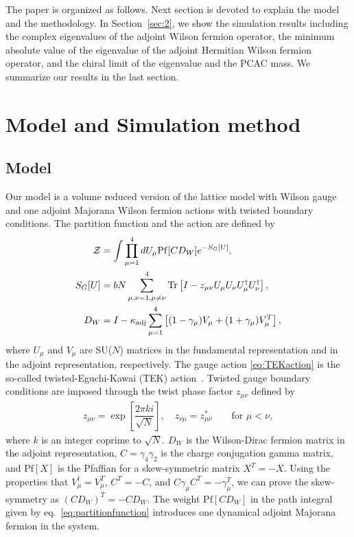 \documentclass[a4paper,11pt]{article}
\begin{document}
The paper is organized as follows. Next section is devoted to explain
the model and the methodology.
In Section~\ref{sec:2}, we show the simulation results including
the complex eigenvalues of the adjoint Wilson fermion operator,
the minimum absolute value of the eigenvalue of the adjoint Hermitian Wilson fermion operator,
and the chiral limit of the eigenvalue and the PCAC mass.
We summarize our results in the last section.

\section{Model and Simulation method}
\subsection{Model}
Our model is a volume reduced version of the lattice model with Wilson gauge and one adjoint Majorana Wilson
fermion actions with twisted boundary conditions.
The partition function and the action are defined by
\begin{align}
  {\cal Z} & =\int \prod_{\mu=1}^{4} dU_{\mu} \mathrm{Pf}[CD_W]e^{-S_G[U]},
             \label{eq:partitionfunction}
  \\
  S_G[U] &=  b N \sum_{\mu,\nu=1,\mu\ne\nu}^{4} \mathrm{Tr}\left[ I - z_{\mu\nu} U_{\mu}U_{\nu}U_{\mu}^{\dag}U_{\nu}^{\dag}\right],
             \label{eq:TEKaction}
  \\
  D_W&= I - \kappa_{\mathrm{adj}}\sum_{\mu=1}^{4}\left[ (1-\gamma_{\mu}) V_{\mu} + (1+\gamma_\mu)V_{\mu}^{T}\right],
             \label{eq:AdjWDmatrix}
\end{align}
where $U_\mu$ and  $V_\mu$ are SU($N$) matrices in the fundamental representation and in the adjoint representation, respectively.
The gauge action \eqref{eq:TEKaction} is the so-called twisted-Eguchi-Kawai (TEK)
action~\cite{Eguchi:1982nm,GonzalezArroyo:1982ub,GonzalezArroyo:1982hz}.
Twisted gauge boundary conditions are imposed through the twist phase factor $z_{\mu\nu}$ defined by
\begin{align}
 z_{\mu\nu} =\exp\left[\dfrac{2\pi k i}{\sqrt{N}}\right], \quad z_{\nu\mu}=z_{\mu\nu}^{*} \qquad \mbox{for $\mu < \nu$},
\end{align}
where $k$ is an integer coprime to $\sqrt{N}$.
$D_W$ is the Wilson-Dirac fermion matrix in the adjoint representation, $C=\gamma_4\gamma_2$ is the charge conjugation gamma matrix, and
$\mathrm{Pf}[X]$ is the Pfaffian for a skew-symmetric matrix $X^T=-X$.
Using the properties that $V_{\mu}^{\dag}=V_{\mu}^{T}$, $C^{T}=-C$, and  $C\gamma_\mu C^{T}=-\gamma_\mu^T$, we can prove
the skew-symmetry as $(CD_W)^T=-CD_W$. The weight $\mathrm{Pf}[CD_W]$ in the path integral given by eq.~\eqref{eq:partitionfunction}
introduces one dynamical adjoint Majorana fermion in the system.
\end{document}

